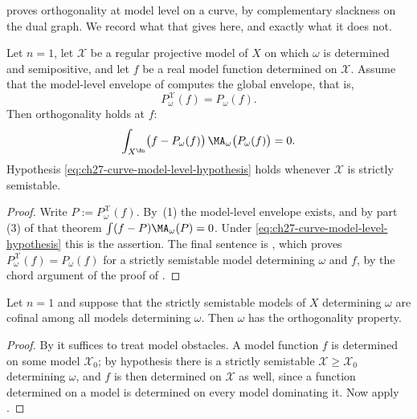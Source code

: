  proves orthogonality at model level on a curve, by
complementary slackness on the dual graph.  We record what that gives here,
and exactly what it does not.

\begin{proposition}
\label{prop:ch27-curve-orthogonality}
Let \(n=1\), let \(\mathcal X\) be a regular projective model of \(X\) on
which \(\omega\) is determined and semipositive, and let \(f\) be a real
model function determined on \(\mathcal X\).  Assume that the model-level
envelope of  computes the global
envelope, that is,
\begin{equation}\label{eq:ch27-curve-model-level-hypothesis}
 P^{\mathcal X}_\omega(f)=P_\omega(f).
\end{equation}
Then orthogonality holds at \(f\):
\[
 \int_{X^{\An}}\bigl(f-P_\omega(f)\bigr)\,
   \MA_\omega\bigl(P_\omega(f)\bigr)=0 .
\]
Hypothesis \eqref{eq:ch27-curve-model-level-hypothesis} holds whenever
\(\mathcal X\) is strictly semistable.
\end{proposition}

\begin{proof}
Write \(P:=P^{\mathcal X}_\omega(f)\).  By
\,(1) the model-level envelope
exists, and by part (3) of that theorem
\(\int(f-P)\MA_\omega(P)=0\).  Under
\eqref{eq:ch27-curve-model-level-hypothesis} this is the assertion.  The
final sentence is , which proves
\(P^{\mathcal X}_\omega(f)=P_\omega(f)\) for a strictly semistable model
determining \(\omega\) and \(f\), by the chord argument of the proof of
.
\end{proof}

\begin{corollary}
\label{cor:ch27-curve-orthogonality-global}
Let \(n=1\) and suppose that the strictly semistable models of \(X\)
determining \(\omega\) are cofinal among all models determining
\(\omega\).  Then \(\omega\) has the orthogonality property.
\end{corollary}

\begin{proof}
By  it suffices to treat model
obstacles.  A model function \(f\) is determined on some model
\(\mathcal X_0\); by hypothesis there is a strictly semistable
\(\mathcal X\geq\mathcal X_0\) determining \(\omega\), and \(f\) is then
determined on \(\mathcal X\) as well, since a function determined on a model
is determined on every model dominating it.  Now apply
.
\end{proof}

